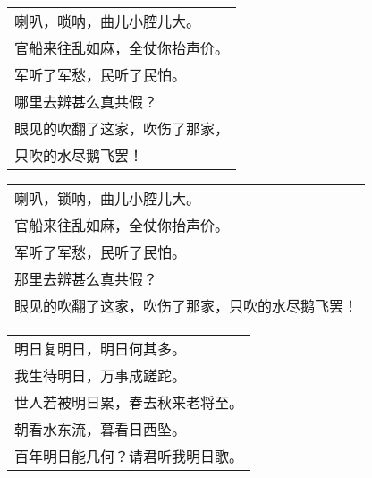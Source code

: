 \nopagebreak%
\nopagebreak%
\noindent\begin{minipage}{\linewidth}
  \vskip-3pt\begin{table}[H]
    \centering
    \begin{tabular}{@{}l@{}}
喇叭，唢呐，曲儿小腔儿大。\\
官船来往乱如麻，全仗你抬声价。\\
军听了军愁，民听了民怕。\\
哪里去辨甚么真共假？\\
眼见的吹翻了这家，吹伤了那家，\\
只吹的水尽鹅飞罢！
    \end{tabular}
  \end{table}
\end{minipage}
\vspace{1cm}


\nopagebreak%
\nopagebreak%
\noindent\begin{minipage}{\linewidth}
  \vskip-3pt\begin{table}[H]
    \centering
    \begin{tabular}{@{}l@{}}
喇叭，锁呐，曲儿小腔儿大。\\
官船来往乱如麻，全仗你抬声价。\\
军听了军愁，民听了民怕。\\
那里去辨甚么真共假？\\
眼见的吹翻了这家，吹伤了那家，只吹的水尽鹅飞罢！
    \end{tabular}
  \end{table}
\end{minipage}
\vspace{1cm}


\nopagebreak%
\nopagebreak%
\noindent\begin{minipage}{\linewidth}
  \vskip-3pt\begin{table}[H]
    \centering
    \begin{tabular}{@{}l@{}}
明日复明日，明日何其多。\\
我生待明日，万事成蹉跎。\\
世人若被明日累，春去秋来老将至。\\
朝看水东流，暮看日西坠。\\
百年明日能几何？请君听我明日歌。
    \end{tabular}
  \end{table}
\end{minipage}
\vspace{1cm}


